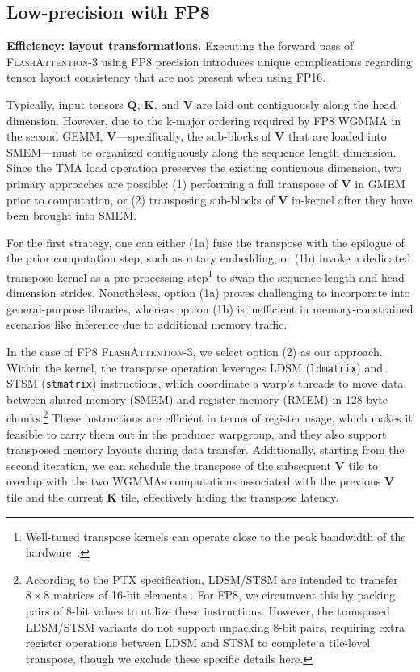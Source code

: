 \begin{algorithm}[H]
\begin{algorithmic}[1]
\subsection{Low-precision with FP8}
\label{sec:algofp8}

\textbf{Efficiency: layout transformations.} Executing the forward pass of \textsc{FlashAttention-3} using FP8 precision introduces unique complications regarding tensor layout consistency that are not present when using FP16.

Typically, input tensors $\mathbf{Q}$, $\mathbf{K}$, and $\mathbf{V}$ are laid out contiguously along the head dimension. However, due to the k-major ordering required by FP8 WGMMA in the second GEMM, $\mathbf{V}$—specifically, the sub-blocks of $\mathbf{V}$ that are loaded into SMEM—must be organized contiguously along the sequence length dimension. Since the TMA load operation preserves the existing contiguous dimension, two primary approaches are possible: (1) performing a full transpose of $\mathbf{V}$ in GMEM prior to computation, or (2) transposing sub-blocks of $\mathbf{V}$ in-kernel after they have been brought into SMEM. 

For the first strategy, one can either (1a) fuse the transpose with the epilogue of the prior computation step, such as rotary embedding, or (1b) invoke a dedicated transpose kernel as a pre-processing step\footnote{Well-tuned transpose kernels can operate close to the peak bandwidth of the hardware~\citep{colfax_cutlass_transpose_2024}.} to swap the sequence length and head dimension strides. Nonetheless, option (1a) proves challenging to incorporate into general-purpose libraries, whereas option (1b) is inefficient in memory-constrained scenarios like inference due to additional memory traffic.

In the case of FP8 \textsc{FlashAttention-3}, we select option (2) as our approach. Within the kernel, the transpose operation leverages LDSM (\verb|ldmatrix|) and STSM (\verb|stmatrix|) instructions, which coordinate a warp’s threads to move data between shared memory (SMEM) and register memory (RMEM) in 128-byte chunks.\footnote{According to the PTX specification, LDSM/STSM are intended to transfer $8 \times 8$ matrices of 16-bit elements \cite[\S 9.7.13.4.15-16]{ptx}. For FP8, we circumvent this by packing pairs of 8-bit values to utilize these instructions. However, the transposed LDSM/STSM variants do not support unpacking 8-bit pairs, requiring extra register operations between LDSM and STSM to complete a tile-level transpose, though we exclude these specific details here.} These instructions are efficient in terms of register usage, which makes it feasible to carry them out in the producer warpgroup, and they also support transposed memory layouts during data transfer. Additionally, starting from the second iteration, we can schedule the transpose of the subsequent $\mathbf{V}$ tile to overlap with the two WGMMAs computations associated with the previous $\mathbf{V}$ tile and the current $\mathbf{K}$ tile, effectively hiding the transpose latency.


\end{algorithmic}
\end{algorithm}
